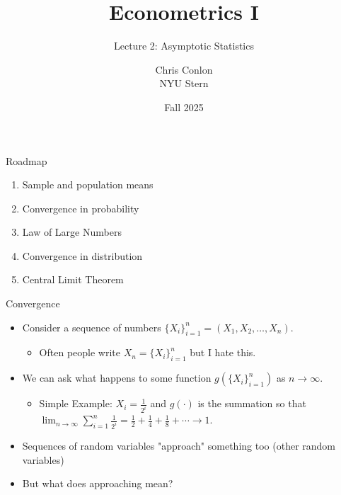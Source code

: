 




\title{Econometrics I}
\subtitle{Lecture 2: Asymptotic Statistics}

\author{Chris Conlon \\NYU Stern}
\date{Fall 2025}
\maketitle


\begin{frame}{Roadmap}
\begin{enumerate}
	\item Sample and population means
	\item Convergence in probability
	\item Law of Large Numbers
	\item Convergence in distribution
	\item Central Limit Theorem
\end{enumerate}
\end{frame}

\begin{frame}{Convergence}
\begin{itemize}
	\item Consider a sequence of numbers $\{X_i\}_{i=1}^n = \left(X_1,X_2,\ldots,X_n\right)$.
	\begin{itemize}
		\item Often people write $X_n =  \{X_i\}_{i=1}^n$ but I hate this.
	\end{itemize}
	\item We can ask what happens to some function $g(\{X_i\}_{i=1}^n)$ as $n \rightarrow \infty$.
	\begin{itemize}
		\item Simple Example: $X_i = \frac{1}{2^i}$ and $g(\cdot)$ is the summation so that $\lim_{n \rightarrow \infty}\sum_{i=1}^n \frac{1}{2^i} =  \frac{1}{2} + \frac{1}{4} + \frac{1}{8} + \cdots \rightarrow 1$.
	\end{itemize}
	\item Sequences of \alert{random variables} "approach" something too (other \alert{random variables})
	\item But what does \alert{approaching} mean?
\end{itemize}
\end{frame}

